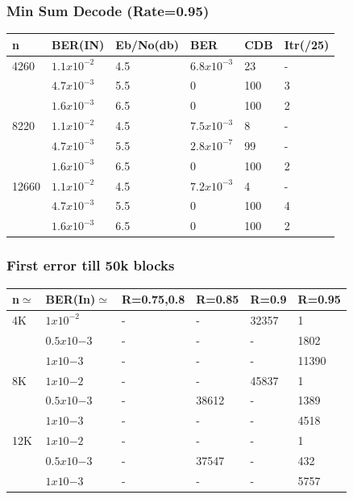 \documentclass[xcolor=dvipsname]
{beamer}
\begin{document}
\begin{frame}[t] 
\frametitle{Min Sum Decode (Rate=0.95)}

\begin{table}[]
\centering
\begin{tabular}{|l|l|l|l|l|l|}
\hline
n     & BER(IN)& Eb/No(db) & BER    & CDB & Itr(/25) \\ \hline
4260  & $1.1x10^{-2}$ & 4.5   & $6.8x10^{-3}$      & 23 &  -       \\ 
      & $4.7x10^{-3}$ & 5.5   & 0           & 100 & 3         \\  
      & $1.6x10^{-3}$ & 6.5   & 0           & 100 & 2         \\ \hline
8220  & $1.1x10^{-2}$ & 4.5   & $7.5x10^{-3}$      & 8 & -         \\ 
      & $4.7x10^{-3}$ & 5.5   & $2.8x10^{-7}$      & 99 & -         \\ 
      & $1.6x10^{-3}$ & 6.5   & 0      & 100 & 2         \\ \hline
12660 & $1.1x10^{-2}$ & 4.5   & $7.2x10^{-3}$      & 4 & -        \\ 
      & $4.7x10^{-3}$ & 5.5   & 0      & 100 & 4         \\ 
      & $1.6x10^{-3}$ & 6.5   & 0      & 100 & 2         \\ \hline      
\end{tabular}
\end{table}

\end{frame}

\begin{frame}[t] 
\frametitle{First error till 50k blocks}

\begin{table}[]
\centering
\begin{tabular}{|l|l|l|l|l|l|}
\hline
n$\simeq$   & BER(In)$\simeq$    & R=0.75,0.8 & R=0.85  & R=0.9 & R=0.95 \\ \hline
4K  & $1x10^{-2}$  & -          & -    & 32357   & 1       \\ \hline
    & $0.5x10{-3}$ & -          & -    & - & 1802   \\ \hline
    & $1x10{-3}$   & -          & -    & -     & 11390  \\ \hline
8K  & $1x10{-2}$   & -          & -    &  45837   & 1      \\ \hline
    & $0.5x10{-3}$ & -          & 38612   & -    & 1389   \\ \hline
    & $1x10{-3}$   & -          & -       & -     & 4518   \\ \hline
12K & $1x10{-2}$   & -          & -    & -     & 1      \\ \hline
    & $0.5x10{-3}$ & -          & 37547   & -     & 432    \\ \hline
    & $1x10{-3}$   & -          & -       & -     & 5757   \\ \hline
\end{tabular}
\end{table}

\end{frame}
\end{document}
